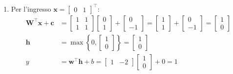 ﻿\documentclass[11pt, a4paper]{article}
\begin{document}
\begin{enumerate}
    \item Per l'ingresso $\bm{x} = \begin{bmatrix} 0 & 1 \end{bmatrix}^\top$:
    \begin{align*}
    \bm{W}^\top \bm{x} + \bm{c} &= \begin{bmatrix} 1 & 1 \\ 1 & 1 \end{bmatrix} \begin{bmatrix} 0 \\ 1 \end{bmatrix} + \begin{bmatrix} 0 \\ -1 \end{bmatrix} = \begin{bmatrix} 1 \\ 1 \end{bmatrix} + \begin{bmatrix} 0 \\ -1 \end{bmatrix} = \begin{bmatrix} 1 \\ 0 \end{bmatrix} \\
    \bm{h} &= \max\left\{0, \begin{bmatrix} 1 \\ 0 \end{bmatrix}\right\} = \begin{bmatrix} 1 \\ 0 \end{bmatrix} \\
    y &= \bm{w}^\top \bm{h} + b = \begin{bmatrix} 1 & -2 \end{bmatrix} \begin{bmatrix} 1 \\ 0 \end{bmatrix} + 0 = \boxed{1}
    \end{align*}


\end{enumerate}
\end{document}
